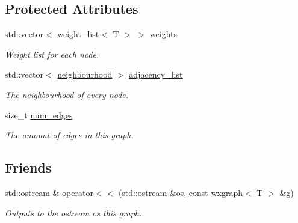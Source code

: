 \subsection*{Protected Attributes}
\begin{DoxyCompactItemize}
\item 
std\+::vector$<$ \hyperlink{namespacelgraph_a1e0fd5ef0a78b2a92da48adbed265cb6}{weight\+\_\+list}$<$ T $>$ $>$ \hyperlink{classlgraph_1_1wxgraph_a6f8c983edc82913c2d78b7bc871defe8}{weights}
\begin{DoxyCompactList}\small\item\em Weight list for each node. \end{DoxyCompactList}\item 
\mbox{\label{classlgraph_1_1xxgraph_a31cf82d0b20be05290be259dc97a51ec}} 
std\+::vector$<$ \hyperlink{namespacelgraph_a052e7766c13f3a43cec0aec8173fdede}{neighbourhood} $>$ \hyperlink{classlgraph_1_1xxgraph_a31cf82d0b20be05290be259dc97a51ec}{adjacency\+\_\+list}
\begin{DoxyCompactList}\small\item\em The neighbourhood of every node. \end{DoxyCompactList}\item 
\mbox{\label{classlgraph_1_1xxgraph_a6765a9a3be42f6e0f824635c593b35d7}} 
size\+\_\+t \hyperlink{classlgraph_1_1xxgraph_a6765a9a3be42f6e0f824635c593b35d7}{num\+\_\+edges}
\begin{DoxyCompactList}\small\item\em The amount of edges in this graph. \end{DoxyCompactList}\end{DoxyCompactItemize}
\subsection*{Friends}
\begin{DoxyCompactItemize}
\item 
std\+::ostream \& \hyperlink{classlgraph_1_1wxgraph_a0ba89d65c4392a4f68c8e8138d5dcc66}{operator$<$$<$} (std\+::ostream \&os, const \hyperlink{classlgraph_1_1wxgraph}{wxgraph}$<$ T $>$ \&g)
\begin{DoxyCompactList}\small\item\em Outputs to the ostream {\itshape os} this graph. \end{DoxyCompactList}\end{DoxyCompactItemize}


